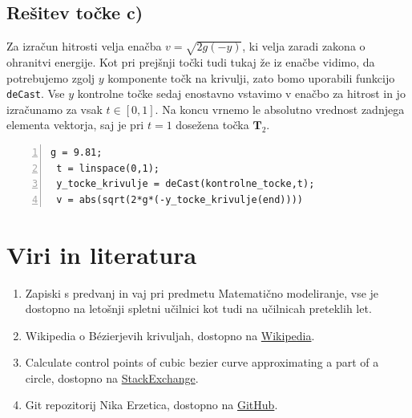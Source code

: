 \documentclass[a4paper,12pt]{article}
\begin{document}
	\subsection{Rešitev točke c)}
	
	Za izračun hitrosti velja enačba $v = \sqrt{2g(-y)}$, ki velja zaradi zakona o ohranitvi energije. 
	Kot pri prejšnji točki tudi tukaj že iz enačbe vidimo, da potrebujemo zgolj $y$ komponente točk na krivulji, zato bomo
	uporabili funkcijo \lstinline[style=Matlab-editor]!deCast!. Vse $y$ kontrolne točke sedaj enostavno vstavimo v enačbo za hitrost in
	jo izračunamo za vsak $t \in [0,1]$. Na koncu vrnemo le absolutno vrednost zadnjega elementa vektorja, saj je pri $t = 1$ dosežena točka $\boldsymbol{T}_2$.

	\begin{lstlisting}[style=Matlab-editor,	numbers=left,]
 g = 9.81;
 t = linspace(0,1);
 y_tocke_krivulje = deCast(kontrolne_tocke,t);
 v = abs(sqrt(2*g*(-y_tocke_krivulje(end))))
	\end{lstlisting}
	

	\section{Viri in literatura}
	
	\begin{enumerate}[label=\textbullet]
		\item Zapiski s predvanj in vaj pri predmetu Matematično modeliranje, vse je dostopno na letošnji spletni učilnici kot tudi na učilnicah preteklih let.
		\item Wikipedia o B\'{e}zierjevih krivuljah, dostopno na \href{https://sl.wikipedia.org/wiki/Bézierova_krivulja}{Wikipedia}.
		\item Calculate control points of cubic bezier curve approximating a part of a circle, dostopno na \href{https://math.stackexchange.com/questions/873224/calculate-control-points-of-cubic-bezier-curve-approximating-a-part-of-a-circle}{StackExchange}.
		\item Git repozitorij Nika Erzetica, dostopno na \href{https://github.com/nikerzetic/matematicno-modeliranje}{GitHub}.
	\end{enumerate}
	
\end{document}
